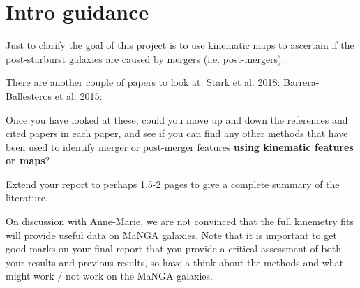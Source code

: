 \section*{Intro guidance}

Just to clarify the goal of this project is to use kinematic maps to ascertain if the post-starburst galaxies are caused by mergers (i.e. post-mergers). 

There are another couple of papers to look at:
Stark et al. 2018: \citep{2018MNRAS.480.2217S} 
Barrera-Ballesteros et al. 2015: \citep{2015A&A...582A..21B}
 
Once you have looked at these, could you move up and down the references and cited papers in each paper, and see if you can find any other methods that have been used to identify merger or post-merger features \textbf{using kinematic features or maps}?
 
Extend your report to perhaps 1.5-2 pages to give a complete summary of the literature.

On discussion with Anne-Marie, we are not convinced that the full kinemetry fits will provide useful data on MaNGA galaxies. Note that it is important to get good marks on your final report that you provide a critical assessment of both your results and previous results, so have a think about the methods and what might work / not work on the MaNGA galaxies. 

